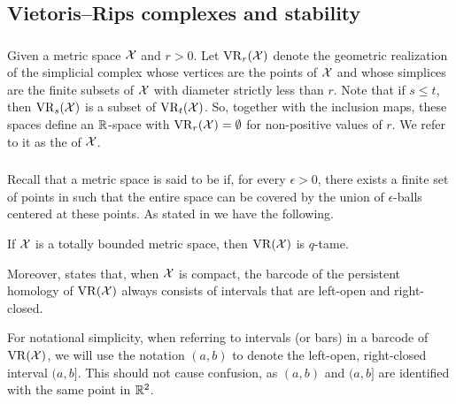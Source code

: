 \subsection{Vietoris--Rips complexes and stability}

\subsubsection{}

Given a metric space $\mathcal{X}$ and $r > 0$.
Let $\operatorname{VR}_r(\mathcal{X})$ denote the geometric realization of the simplicial complex whose vertices are the points of $\mathcal{X}$ and whose simplices are the finite subsets of $\mathcal{X}$ with diameter strictly less than $r$.
Note that if $s \leq t$, then $\operatorname{VR}_s(\mathcal{X})$ is a subset of $\operatorname{VR}_t(\mathcal{X})$.
So, together with the inclusion maps, these spaces define an $\mathbb{R}$-space with $\operatorname{VR}_r(\mathcal{X}) = \emptyset$ for non-positive values of $r$.
We refer to it as the  of $\mathcal{X}$.

\subsubsection{}

Recall that a metric space is said to be  if, for every $\epsilon > 0$, there exists a finite set of points in such that the entire space can be covered by the union of $\epsilon$-balls centered at these points.
As stated in \cite[Prop.~5.1]{chazal2014geometric} we have the following.

\medskip\lemma
If $\mathcal{X}$ is a totally bounded metric space, then $\operatorname{VR}(\mathcal{X})$ is $q$-tame. 
\medskip

Moreover, \cite[Thm.~5.2]{lim2020vietoris} states that, when $\mathcal{X}$ is compact, the barcode of the persistent homology of $\operatorname{VR}(\mathcal{X})$ always consists of intervals that are left-open and right-closed.

For notational simplicity, when referring to intervals (or bars) in a barcode of $\operatorname{VR}(\mathcal{X})$, we will use the notation $(a, b)$ to denote the left-open, right-closed interval $(a, b]$.
This should not cause confusion, as $(a, b)$ and $(a, b]$ are identified with the same point in $\mathbb{R}^2$.



